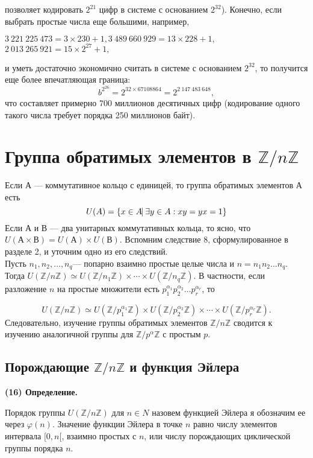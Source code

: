 \hspace{-14pt}позволяет кодировать $2^{21}$ цифр в системе с основанием $2^{32}$). Конечно,
если выбрать простые числа еще большими, например,
\begin{center}
$3\ 221\ 225\ 473 = 3 \times 230 + 1, 3\ 489\ 660\ 929= 13 \times 228 + 1,$
$2\ 013\ 265\ 921 = 15\times2^{27} + 1,$
\end{center}
и уметь достаточно экономично считать в системе с основанием $2^{32}$,
то получится еще более впечатляющая граница:
$$b^{2^{26}} = 2^{32 \times 67108864} = 2^{2\ 147\ 483\ 648},$$
что составляет примерно 700 миллионов десятичных цифр 
(кодирование одного такого числа требует порядка 250 миллионов байт).
\vspace{10pt}


\sectiontop
\section{Группа обратимых элементов в $\mathbb{Z}/n\mathbb{Z}$}


\hspace{-14pt}Если А --- коммутативное кольцо с единицей, то группа обратимых
элементов А есть
$$U(A) = \{x \in A \vrule\ \exists y \in A:xy = yx = 1  \}$$
Если $А$ и $В$ — два унитарных коммутативных кольца, то ясно, что
$U(А \times В) = U(А) \times U(В)$. Вспомним следствие 8, сформулированное в
разделе 2, и уточним одно из его следствий. \\
Пусть $n_{1}, n_{2}, \ldots, n_{q}$--- попарно взаимно простые целые числа и $n = n_1n_2\ldots n_q$. Тогда $U(\mathbb{Z}/n\mathbb{Z})\simeq U(\mathbb{Z}/n_1\mathbb{Z})\times \cdots \times U(\mathbb{Z}/n_q\mathbb{Z})  $. В 
частности, если разложение $n$ на простые множители есть $p_1^{\alpha_1}p_2^{\alpha_2} \ldots p_r^{\alpha_r}$, то

$$U(\mathbb{Z}/n\mathbb{Z})\simeq U(\mathbb{Z}/p_1^{\alpha_1}\mathbb{Z})\times U(\mathbb{Z}/p_2^{\alpha_2}\mathbb{Z}) \times \cdots \times U(\mathbb{Z}/p_r^{\alpha_r}\mathbb{Z}).$$
Следовательно, изучение группы обратимых элементов $\mathbb{Z}/n\mathbb{Z}$ сводится к изучению аналогичной группы для $\mathbb{Z}/p^{\alpha}\mathbb{Z}$ с простым $p$. \\
\sectiontop
\subsection{Порождающие $\mathbb{Z}/n\mathbb{Z}$ и функция Эйлера}
\vspace{4pt}\textbf{(16) Определение.} 
\par
Порядок группы $U(\mathbb{Z}/n\mathbb{Z})$ для $n \in N$ назовем функцией Эйлера я обозначим ее через $\varphi(n)$. Значение функции Эйлера в точке $n$ равно числу элементов интервала $[0, n[$, взаимно простых с $n$, или числу порождающих циклической группы порядка $n$.
\pagebreak
\newpage

